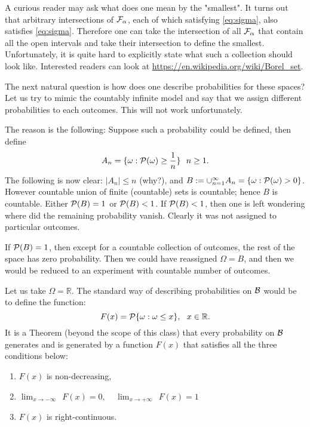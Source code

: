 \begin{remark}
A curious reader may ask what does one mean by the "smallest". It turns out that arbitrary intersections of $\mathcal{F}_\alpha$, each of which  satisfying \ref{eq:sigma}, also satisfies \ref{eq:sigma}. \adv Therefore one can take the intersection of all $\mathcal{F}_\alpha$ that contain all the open intervals and take their intersection to define the smallest. Unfortunately, it is quite hard to explicitly state what such a collection should look like. Interested readers can look at \url{https://en.wikipedia.org/wiki/Borel_set}.
\end{remark}

The next natural question is how does one describe probabilities for these spaces? Let us try to mimic the countably infinite model and say that we assign different probabilities to each outcomes. This will not work unfortunately.

\begin{remark}The reason is the following: Suppose such a probability could be defined, then define
$$ A_n = \{\omega: \mathcal{P}(\omega) \geq \frac{1}{n}\} ~~ n \geq 1.$$
The following is now clear: $|A_n| \leq n$ (why?), and $B:= \cup_{n=1}^\infty A_n = \{\omega: \mathcal{P}(\omega)> 0\}$. \adv However countable union of finite (countable) sets is countable; hence $B$ is countable. Either $\mathcal{P}(B)=1$ or $\mathcal{P}(B) < 1$. If $\mathcal{P}(B) < 1$, then one is left wondering where did the remaining probability vanish. Clearly it was not assigned to particular outcomes.

If $\mathcal{P}(B)=1$, then  except for a countable collection of outcomes, the rest of the space has zero probability. Then we could have reassigned $\Omega = B$, and then we would be reduced to an experiment with countable number of outcomes. \end{remark}

Let us take $\Omega=\mathbb{R}$. The standard way of describing probabilities on $\mathcal{B}$ would be to define the function:
$$ F(x)=\mathcal{P}\{\omega: \omega \leq x\}, ~~ x\in \mathbb{R}.$$
It is a Theorem (beyond the scope of this class) that every probability on $\mathcal{B}$ generates and is generated by a function $F(x)$ that satisfies all the three conditions below:
\begin{enumerate}[$(i)$]
\item $F(x)$ is non-decreasing,
\item $\lim_{x \to -\infty} ~~ F(x) = 0, ~~~~~ \lim_{x \to +\infty} ~~ F(x) = 1$
\item $F(x)$ is right-continuous.
\end{enumerate}

